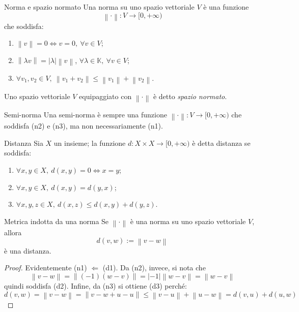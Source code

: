 \documentclass[11pt, a4paper]{scrartcl}
\theoremstyle{definition}
\numberwithin{esempio}{section}
\theoremstyle{definition}
\numberwithin{obs}{section}
\numberwithin{nota}{section}
\numberwithin{equation}{subsection}
\begin{document}
\begin{definizione}
	{Norma e spazio normato}{}
	Una norma su uno spazio vettoriale $V$ \`e una funzione
	\begin{equation}
		\left\lVert \cdot  \right\rVert : V \to [0, +\infty)
	\end{equation}
	che soddisfa:
	\begin{enumerate}[(n1).]
		\item $\left\lVert v \right\rVert =0 \iff v = 0 , \ \forall v\in V$;
		\item $\left\lVert \lambda v \right\rVert = \lvert \lambda  \rvert \left\lVert v \right\rVert $, $\forall \lambda \in \mathbb{K},\ \forall v \in V$;
		\item $\forall v_1,v_2 \in V, \ \left\lVert v_1+v_2 \right\rVert \le \left\lVert v_1 \right\rVert + \left\lVert v_2 \right\rVert $.
	\end{enumerate}
	Uno spazio vettoriale $V$ equipaggiato con $\left\lVert \cdot  \right\rVert $ \`e detto \textit{spazio normato}.
\end{definizione}
\begin{definizione}
	{Semi-norma}{}
	Una semi-norma \`e sempre una funzione $\left\lVert \cdot  \right\rVert : V \to [0,+\infty)$ che soddisfa (n2) e (n3), ma non necessariamente (n1).
\end{definizione}
\begin{definizione}
	{Distanza}{}
	Sia $X$ un insieme; la funzione $d:X \times X \to [0,+\infty)$ \`e detta distanza se soddisfa:
	\begin{enumerate}[(d1).]
		\item $\forall x,y \in X, \ d(x,y) =0 \iff x= y$;
		\item $\forall x,y \in X, \ d(x,y) = d(y,x)$;
		\item $\forall x,y,z \in X, \ d(x,z)\le  d(x,y) + d(y,z)$.
	\end{enumerate}
\end{definizione}
\begin{teorema}
	{Metrica indotta da una norma}{}
	Se $\left\lVert \cdot  \right\rVert $ \`e una norma su uno spazio vettoriale $V$, allora 
	\begin{equation}
		d(v,w) := \left\lVert v-w \right\rVert 
	\end{equation}
	\`e una distanza.
	\begin{proof}
		Evidentemente (n1) $\Leftarrow$ (d1). Da (n2), invece, si nota che
		\[
		\left\lVert v-w \right\rVert = \left\lVert (-1) (w-v) \right\rVert = \lvert -1 \rvert \left\lVert w-v \right\rVert = \left\lVert w-v \right\rVert 
		\] 
		quindi soddisfa (d2). 
		Infine, da (n3)	si ottiene (d3) perch\'e:
		\begin{equation*}
			d(v,w) = \left\lVert v-w \right\rVert = \left\lVert v-w +u -u \right\rVert \le \left\lVert v-u \right\rVert + \left\lVert u-w \right\rVert = d(v,u) + d(u,w)
		\end{equation*}
	\end{proof}
\end{teorema}
\end{document}
